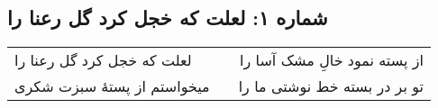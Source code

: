 \begin{center}
\section*{شماره ۱: لعلت که خجل کرد گل رعنا را}
\label{sec:001}
\begin{longtable}{l p{0.5cm} r}
لعلت که خجل کرد گل رعنا را
&&
از پسته نمود خالِ مشک آسا را
\\
میخواستم از پستهٔ سبزت شکری
&&
تو بر در بسته خط نوشتی ما را
\\
\end{longtable}
\end{center}
